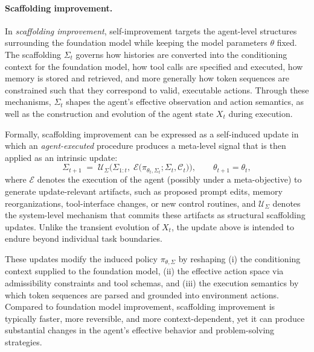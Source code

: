 \paragraph{Scaffolding improvement.}
In \emph{scaffolding improvement}, self-improvement targets the agent-level structures surrounding the foundation model while keeping the model parameters $\theta$ fixed. The scaffolding $\Sigma_t$ governs how histories are converted into the conditioning context for the foundation model, how tool calls are specified and executed, how memory is stored and retrieved, and more generally how token sequences are constrained such that they correspond to valid, executable actions. Through these mechanisms, $\Sigma_t$ shapes the agent’s effective observation and action semantics, as well as the construction and evolution of the agent state $X_t$ during execution.

Formally, scaffolding improvement can be expressed as a self-induced update in which an \emph{agent-executed} procedure produces a meta-level signal that is then applied as an intrinsic update:
\begin{equation}
\Sigma_{t+1} \;=\; \mathcal{U}_\Sigma \Big(\Sigma_{1:t},\; \mathcal{E}\big(\pi_{\theta_t,\Sigma_t}; \Sigma_t, \mathcal{C}_t\big)\Big), \qquad \theta_{t+1}=\theta_t,
\end{equation}
where $\mathcal{E}$ denotes the execution of the agent (possibly under a meta-objective) to generate update-relevant artifacts, such as proposed prompt edits, memory reorganizations, tool-interface changes, or new control routines, and $\mathcal{U}_\Sigma$ denotes the system-level mechanism that commits these artifacts as structural scaffolding updates. Unlike the transient evolution of $X_t$, the update above is intended to endure beyond individual task boundaries.

These updates modify the induced policy $\pi_{\theta,\Sigma}$ by reshaping (i) the conditioning context supplied to the foundation model, (ii) the effective action space via admissibility constraints and tool schemas, and (iii) the execution semantics by which token sequences are parsed and grounded into environment actions. Compared to foundation model improvement, scaffolding improvement is typically faster, more reversible, and more context-dependent, yet it can produce substantial changes in the agent’s effective behavior and problem-solving strategies.


